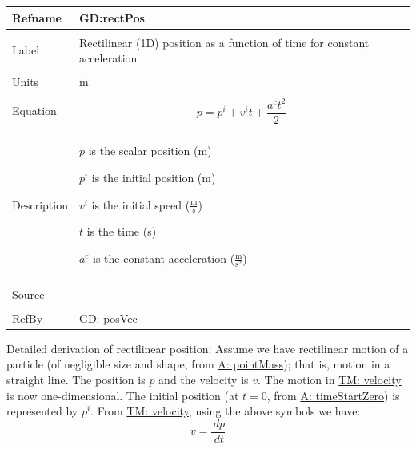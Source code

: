 \documentclass[12pt]{article}
\begin{document}
\noindent \begin{minipage}{\textwidth}
\begin{tabular}{>{\raggedright}p{}>{\raggedright\arraybackslash}p{}}
\toprule \textbf{Refname} & \textbf{GD:rectPos}
\label{GD:rectPos}
\\ \midrule \\
Label & Rectilinear (1D) position as a function of time for constant acceleration
\\ \midrule \\
Units & m
\\ \midrule \\
Equation & \begin{displaymath}
           p={p^{i}}+{v^{i}} t+\frac{{a^{c}} t^{2}}{2}
           \end{displaymath}
\\ \midrule \\
Description & \begin{symbDescription}
              \item{$p$ is the scalar position (m)}
              \item{${p^{i}}$ is the initial position (m)}
              \item{${v^{i}}$ is the initial speed ($\frac{\text{m}}{\text{s}}$)}
              \item{$t$ is the time (s)}
              \item{${a^{c}}$ is the constant acceleration ($\frac{\text{m}}{\text{s}^{2}}$)}
              \end{symbDescription}
\\ \midrule \\
Source & \cite[(pg. 8)]{hibbeler2004}
\\ \midrule \\
RefBy & \hyperref[GD:posVec]{GD: posVec}
\\ \bottomrule \end{tabular}
\end{minipage}
Detailed derivation of rectilinear position:
Assume we have rectilinear motion of a particle (of negligible size and shape, from \hyperref[pointMass]{A: pointMass}); that is, motion in a straight line. The position is $p$ and the velocity is $v$. The motion in \hyperref[TM:velocity]{TM: velocity} is now one-dimensional. The initial position (at $t=0$, from \hyperref[timeStartZero]{A: timeStartZero}) is represented by ${p^{i}}$. From \hyperref[TM:velocity]{TM: velocity}, using the above symbols we have:
\begin{displaymath}
v=\frac{\,dp}{\,dt}
\end{displaymath}
\end{document}
